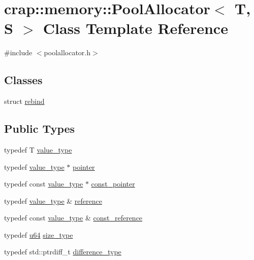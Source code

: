 \hypertarget{classcrap_1_1memory_1_1_pool_allocator}{\section{crap\-:\-:memory\-:\-:Pool\-Allocator$<$ T, S $>$ Class Template Reference}
\label{classcrap_1_1memory_1_1_pool_allocator}
}


{\ttfamily \#include $<$poolallocator.\-h$>$}

\subsection*{Classes}
\begin{DoxyCompactItemize}
\item 
struct \hyperlink{structcrap_1_1memory_1_1_pool_allocator_1_1rebind}{rebind}
\end{DoxyCompactItemize}
\subsection*{Public Types}
\begin{DoxyCompactItemize}
\item 
typedef T \hyperlink{classcrap_1_1memory_1_1_pool_allocator_a48750c5fcf1b7ee89f09af6cf3af1e65}{value\-\_\-type}
\item 
typedef \hyperlink{classcrap_1_1memory_1_1_pool_allocator_a48750c5fcf1b7ee89f09af6cf3af1e65}{value\-\_\-type} $\ast$ \hyperlink{classcrap_1_1memory_1_1_pool_allocator_a4de0cc524be4b7f4fd16c1ac54383c71}{pointer}
\item 
typedef const \hyperlink{classcrap_1_1memory_1_1_pool_allocator_a48750c5fcf1b7ee89f09af6cf3af1e65}{value\-\_\-type} $\ast$ \hyperlink{classcrap_1_1memory_1_1_pool_allocator_afb622f1279d38037c15d9d4edfcf8b73}{const\-\_\-pointer}
\item 
typedef \hyperlink{classcrap_1_1memory_1_1_pool_allocator_a48750c5fcf1b7ee89f09af6cf3af1e65}{value\-\_\-type} \& \hyperlink{classcrap_1_1memory_1_1_pool_allocator_a0040a8887356f723907ec1dac0a88fe8}{reference}
\item 
typedef const \hyperlink{classcrap_1_1memory_1_1_pool_allocator_a48750c5fcf1b7ee89f09af6cf3af1e65}{value\-\_\-type} \& \hyperlink{classcrap_1_1memory_1_1_pool_allocator_ad3705c8900e2a4bff380986d92ae6f7e}{const\-\_\-reference}
\item 
typedef \hyperlink{types_8h_a3f7e2bcbb0b4c338f3c4f6c937cd4234}{u64} \hyperlink{classcrap_1_1memory_1_1_pool_allocator_a867ec9bb97be57d8fdae439d38b6ea68}{size\-\_\-type}
\item 
typedef std\-::ptrdiff\-\_\-t \hyperlink{classcrap_1_1memory_1_1_pool_allocator_a8cfc527593aee68d4e92445e656f3a7b}{difference\-\_\-type}
\end{DoxyCompactItemize}
